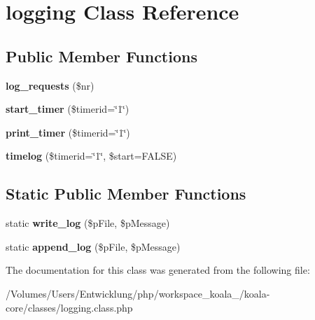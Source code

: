 \hypertarget{classlogging}{
\section{logging Class Reference}
\label{classlogging}
}
\subsection*{Public Member Functions}
\begin{DoxyCompactItemize}
\item 
\hypertarget{classlogging_acab0716e9298cf708731372588fd32c3}{
{\bfseries log\_\-requests} (\$nr)}
\label{classlogging_acab0716e9298cf708731372588fd32c3}

\item 
\hypertarget{classlogging_a31b7a5adb1cbe82cc1e0a9911a26c189}{
{\bfseries start\_\-timer} (\$timerid=\char`\"{}1\char`\"{})}
\label{classlogging_a31b7a5adb1cbe82cc1e0a9911a26c189}

\item 
\hypertarget{classlogging_a8d7498b5b7db8a2d0172683c556b7e1c}{
{\bfseries print\_\-timer} (\$timerid=\char`\"{}1\char`\"{})}
\label{classlogging_a8d7498b5b7db8a2d0172683c556b7e1c}

\item 
\hypertarget{classlogging_a9ff648e8190d246aa385bc8b7af7f19b}{
{\bfseries timelog} (\$timerid=\char`\"{}1\char`\"{}, \$start=FALSE)}
\label{classlogging_a9ff648e8190d246aa385bc8b7af7f19b}

\end{DoxyCompactItemize}
\subsection*{Static Public Member Functions}
\begin{DoxyCompactItemize}
\item 
\hypertarget{classlogging_a7733c3cfeee81e7aa371345597ba4198}{
static {\bfseries write\_\-log} (\$pFile, \$pMessage)}
\label{classlogging_a7733c3cfeee81e7aa371345597ba4198}

\item 
\hypertarget{classlogging_a143b90188314ab149f300a09733d7335}{
static {\bfseries append\_\-log} (\$pFile, \$pMessage)}
\label{classlogging_a143b90188314ab149f300a09733d7335}

\end{DoxyCompactItemize}


The documentation for this class was generated from the following file:\begin{DoxyCompactItemize}
\item 
/Volumes/Users/Entwicklung/php/workspace\_\-koala\_/koala-\/core/classes/logging.class.php\end{DoxyCompactItemize}
